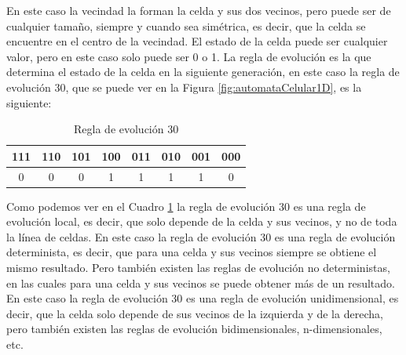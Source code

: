     \vskip 0.5cm
    En este caso la vecindad la forman la celda y sus dos vecinos, pero puede ser de cualquier tama\~no, siempre y cuando
        sea sim\'etrica, es decir, que la celda se encuentre en el centro de la vecindad. El estado de la celda puede ser
        cualquier valor, pero en este caso solo puede ser 0 o 1. La regla de evoluci\'on es la que determina el estado de
        la celda en la siguiente generaci\'on, en este caso la regla de evoluci\'on 30, que se puede ver en la Figura
        \ref{fig:automataCelular1D}, es la siguiente:
        \begin{table}[h!]
            \centering
            \begin{tabular}{|c|c|c|c|c|c|c|c|}
                \hline
                \textbf{111} & \textbf{110} & \textbf{101} & \textbf{100} & \textbf{011} & \textbf{010} & \textbf{001} & \textbf{000} \\
                \hline
                0 & 0 & 0 & 1 & 1 & 1 & 1 & 0 \\
                \hline
            \end{tabular}
            \caption{Regla de evoluci\'on 30}
            \label{tab:reglaEvolucion30}
        \end{table}
    \vskip 0.5cm
    Como podemos ver en el Cuadro \ref{tab:reglaEvolucion30} la regla de evoluci\'on 30 es una regla de evoluci\'on local, 
        es decir, que solo depende de la celda y sus vecinos, y no de toda la l\'inea de celdas. En este caso la regla de evoluci\'on
        30 es una regla de evoluci\'on determinista, es decir, que para una celda y sus vecinos siempre se obtiene el mismo resultado.
        Pero tambi\'en existen las reglas de evoluci\'on no deterministas, en las cuales para una celda y sus vecinos se puede obtener
        m\'as de un resultado. En este caso la regla de evoluci\'on 30 es una regla de evoluci\'on unidimensional, es decir, que la
        celda solo depende de sus vecinos de la izquierda y de la derecha, pero tambi\'en existen las reglas de evoluci\'on
        bidimensionales, n-dimensionales, etc.
    \vskip 0.5cm
